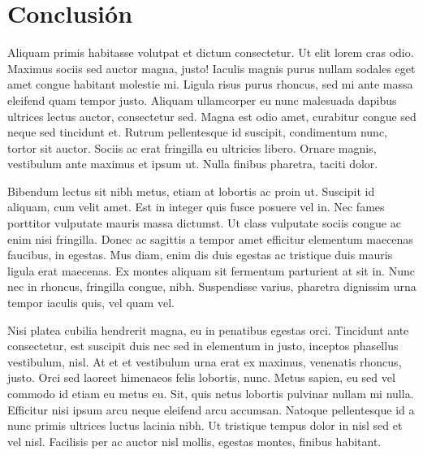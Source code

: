 \documentclass[12pt,spanish,]{article}
\begin{document}
\hypertarget{conclusiuxf3n}{%
\section{Conclusión}\label{conclusiuxf3n}}

Aliquam primis habitasse volutpat et dictum consectetur. Ut elit lorem cras odio. Maximus sociis sed auctor magna, justo! Iaculis magnis purus nullam sodales eget amet congue habitant molestie mi. Ligula risus purus rhoncus, sed mi ante massa eleifend quam tempor justo. Aliquam ullamcorper eu nunc malesuada dapibus ultrices lectus auctor, consectetur sed. Magna est odio amet, curabitur congue sed neque sed tincidunt et. Rutrum pellentesque id suscipit, condimentum nunc, tortor sit auctor. Sociis ac erat fringilla eu ultricies libero. Ornare magnis, vestibulum ante maximus et ipsum ut. Nulla finibus pharetra, taciti dolor.

Bibendum lectus sit nibh metus, etiam at lobortis ac proin ut. Suscipit id aliquam, cum velit amet. Est in integer quis fusce posuere vel in. Nec fames porttitor vulputate mauris massa dictumst. Ut class vulputate sociis congue ac enim nisi fringilla. Donec ac sagittis a tempor amet efficitur elementum maecenas faucibus, in egestas. Mus diam, enim dis duis egestas ac tristique duis mauris ligula erat maecenas. Ex montes aliquam sit fermentum parturient at sit in. Nunc nec in rhoncus, fringilla congue, nibh. Suspendisse varius, pharetra dignissim urna tempor iaculis quis, vel quam vel.

Nisi platea cubilia hendrerit magna, eu in penatibus egestas orci. Tincidunt ante consectetur, est suscipit duis nec sed in elementum in justo, inceptos phasellus vestibulum, nisl. At et et vestibulum urna erat ex maximus, venenatis rhoncus, justo. Orci sed laoreet himenaeos felis lobortis, nunc. Metus sapien, eu sed vel commodo id etiam eu metus eu. Sit, quis netus lobortis pulvinar nullam mi nulla. Efficitur nisi ipsum arcu neque eleifend arcu accumsan. Natoque pellentesque id a nunc primis ultrices luctus lacinia nibh. Ut tristique tempus dolor in nisl sed et vel nisl. Facilisis per ac auctor nisl mollis, egestas montes, finibus habitant.
\end{document}
